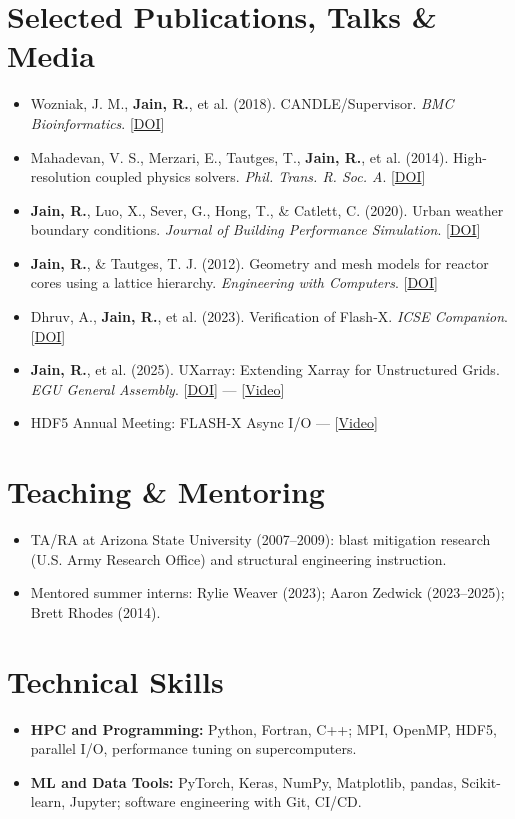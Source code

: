 \documentclass[10pt,letterpaper]{article}
\newcommand{\resumeSubHeadingListStart}{\begin{itemize}[leftmargin=0.15in, label={}]}%
\newcommand{\resumeSubHeadingListEnd}{\end{itemize}}
\begin{document}
\section*{Selected Publications, Talks \& Media}
\begin{itemize}[leftmargin=*, itemsep=1pt]
  \item Wozniak, J. M., \textbf{Jain, R.}, et al. (2018). CANDLE/Supervisor. \textit{BMC Bioinformatics}. [\href{https://doi.org/10.1186/s12859-018-2056-3}{DOI}]
  \item Mahadevan, V. S., Merzari, E., Tautges, T., \textbf{Jain, R.}, et al. (2014). High-resolution coupled physics solvers. \textit{Phil. Trans. R. Soc. A}. [\href{https://doi.org/10.1098/rsta.2013.0381}{DOI}]
  \item \textbf{Jain, R.}, Luo, X., Sever, G., Hong, T., \& Catlett, C. (2020). Urban weather boundary conditions. \textit{Journal of Building Performance Simulation}. [\href{https://doi.org/10.1080/19401493.2020.1739106}{DOI}]
  \item \textbf{Jain, R.}, \& Tautges, T. J. (2012). Geometry and mesh models for reactor cores using a lattice hierarchy. \textit{Engineering with Computers}. [\href{https://doi.org/10.1007/s00366-011-0221-4}{DOI}]
  \item Dhruv, A., \textbf{Jain, R.}, et al. (2023). Verification of Flash-X. \textit{ICSE Companion}. [\href{https://doi.org/10.1109/ICSE-Companion60176.2023.00107}{DOI}]
  \item \textbf{Jain, R.}, et al. (2025). UXarray: Extending Xarray for Unstructured Grids. \textit{EGU General Assembly}. [\href{https://doi.org/10.5194/egusphere-egu25-13873}{DOI}] — [\href{https://www.youtube.com/watch?v=qwqJeOO8m6A&t=545s}{Video}]
  \item HDF5 Annual Meeting: FLASH-X Async I/O — [\href{https://www.youtube.com/watch?v=MuifQ7lHRR8&t=176s}{Video}]
\end{itemize}

\section*{Teaching \& Mentoring}
\begin{itemize}[leftmargin=*, itemsep=1pt]
  \item TA/RA at Arizona State University (2007--2009): blast mitigation research (U.S. Army Research Office) and structural engineering instruction.
  \item Mentored summer interns: Rylie Weaver (2023); Aaron Zedwick (2023--2025); Brett Rhodes (2014).
\end{itemize}

\section*{Technical Skills}
\resumeSubHeadingListStart
  \item \textbf{HPC and Programming:} Python, Fortran, C++; MPI, OpenMP, HDF5, parallel I/O, performance tuning on supercomputers.
  \item \textbf{ML and Data Tools:} PyTorch, Keras, NumPy, Matplotlib, pandas, Scikit-learn, Jupyter; software engineering with Git, CI/CD.
\resumeSubHeadingListEnd
\end{document}
